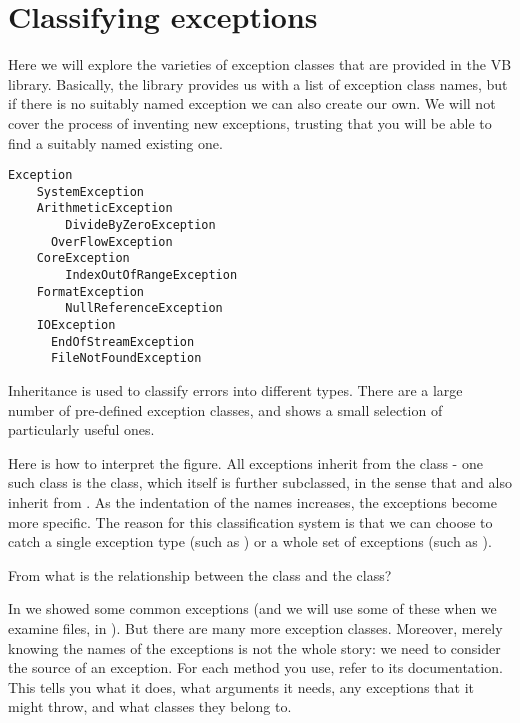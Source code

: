	\section{Classifying exceptions}
		Here we will explore the varieties of exception classes that are provided in the VB library. Basically, the library provides us with a list of exception class names, but if there is no suitably named exception we can also create our own. We will not cover the process of inventing new exceptions, trusting that you will be able to find a suitably named existing one.

		\begin{lstlisting}[label=lst:exceptions_classes,caption=A selection of exception classes.]
Exception
	SystemException
  	ArithmeticException
    	DivideByZeroException
      OverFlowException
    CoreException
    	IndexOutOfRangeException
    FormatException
    	NullReferenceException
    IOException
      EndOfStreamException
      FileNotFoundException
		\end{lstlisting}

		
		Inheritance is used to classify errors into different types. There are a large number of pre-defined exception classes, and  shows a small selection of particularly useful ones.
		
		Here is how to interpret the figure. All exceptions inherit from the  class - one such class is the  class, which itself is further subclassed, in the sense that  and  also inherit from . As the indentation of the names increases, the exceptions become more specific. The reason for this classification system is that we can choose to catch a single exception type (such as ) or a whole set of exceptions (such as ).

		\begin{stqb}
			\begin{STQ}
			\item From  what is the relationship between the  class and the  class?
			\end{STQ}
		\end{stqb}
		In  we showed some common exceptions (and we will use some of these when we examine files, in ). But there are many more exception classes. Moreover, merely knowing the names of the exceptions is not the whole story: we need to consider the source of an exception. For each method you use, refer to its documentation. This tells you what it does, what arguments it needs, any exceptions that it might throw, and what classes they belong to.


